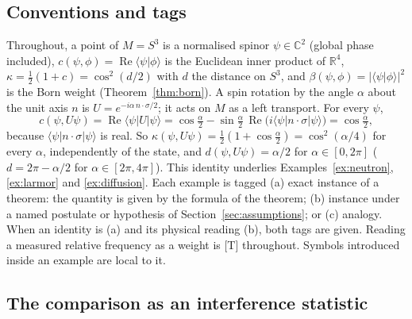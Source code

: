 \documentclass[aps,pra,onecolumn,superscriptaddress,nofootinbib,10pt]{revtex4-2}
\theoremstyle{definition}
\theoremstyle{remark}
\begin{document}
\subsection{Conventions and tags}
Throughout, a point of $M=S^3$ is a normalised spinor $\psi\in\mathbb C^2$ (global phase included),
$c(\psi,\phi)=\operatorname{Re}\langle\psi|\phi\rangle$ is the Euclidean inner product of $\mathbb R^4$,
$\kappa=\tfrac12(1+c)=\cos^2(d/2)$ with $d$ the distance on $S^3$, and $\beta(\psi,\phi)=\lvert\langle\psi|\phi\rangle\rvert^2$
is the Born weight (Theorem~\ref{thm:born}).  A spin rotation by the angle $\alpha$ about the unit axis $n$ is
$U=e^{-i\alpha\,n\cdot\sigma/2}$; it acts on $M$ as a left transport.  For every $\psi$,
\begin{equation}\label{eq:ex-key}
c(\psi,U\psi)=\operatorname{Re}\langle\psi|U|\psi\rangle=\cos\tfrac\alpha2-\sin\tfrac\alpha2\,\operatorname{Re}\bigl(i\langle\psi|n\cdot\sigma|\psi\rangle\bigr)=\cos\tfrac\alpha2 ,
\end{equation}
because $\langle\psi|n\cdot\sigma|\psi\rangle$ is real.  So $\kappa(\psi,U\psi)=\tfrac12(1+\cos\frac\alpha2)=\cos^2(\alpha/4)$ for every $\alpha$, independently of the state, and
$d(\psi,U\psi)=\alpha/2$ for $\alpha\in[0,2\pi]$ ($d=2\pi-\alpha/2$ for $\alpha\in[2\pi,4\pi]$).  This identity underlies Examples~\ref{ex:neutron}, \ref{ex:larmor} and
\ref{ex:diffusion}.  Each example is tagged (a) exact instance of a theorem: the quantity is given by
the formula of the theorem; (b) instance under a named postulate or hypothesis of
Section~\ref{sec:assumptions}; or (c) analogy.  When an identity is (a) and its physical reading (b),
both tags are given.  Reading a measured relative frequency as a weight is [T] throughout.  Symbols
introduced inside an example are local to it.

\subsection{The comparison as an interference statistic}
\end{document}
